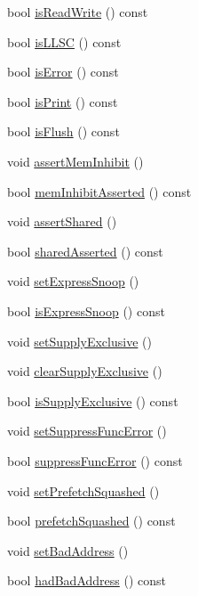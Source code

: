 \begin{DoxyCompactItemize}
bool \hyperlink{classPacket_aa05746eae63aee1fb4758c13d0301a9f}{isReadWrite} () const 
\item 
bool \hyperlink{classPacket_a8965874e960faf91ad4b6af8dbf31875}{isLLSC} () const 
\item 
bool \hyperlink{classPacket_a32759931a1b2d6380407c6a18abd46e3}{isError} () const 
\item 
bool \hyperlink{classPacket_ae56bb417ddf53e85cb389267590fe969}{isPrint} () const 
\item 
bool \hyperlink{classPacket_a5e6baaa42eabbb07af2d1769e3c0499b}{isFlush} () const 
\item 
void \hyperlink{classPacket_a159497b4ab2144a0c1c36d2266df17d1}{assertMemInhibit} ()
\item 
bool \hyperlink{classPacket_a9693a1ffeda326646443ab2a2a92be41}{memInhibitAsserted} () const 
\item 
void \hyperlink{classPacket_a40d9a7952a041e62ac388a0f523dee41}{assertShared} ()
\item 
bool \hyperlink{classPacket_a298938bfa2613955b13f630ce2b591e4}{sharedAsserted} () const 
\item 
void \hyperlink{classPacket_a556d03576cc3d726f41c7e1ad6fbb64a}{setExpressSnoop} ()
\item 
bool \hyperlink{classPacket_aa20026c596161a1efabde68c4a34e00b}{isExpressSnoop} () const 
\item 
void \hyperlink{classPacket_ad0e298222c7b6801ea282a177fac7c39}{setSupplyExclusive} ()
\item 
void \hyperlink{classPacket_a36834b936b153f19a035352b14cf180e}{clearSupplyExclusive} ()
\item 
bool \hyperlink{classPacket_ae74f555f87001a9695338ce38a6ce8ee}{isSupplyExclusive} () const 
\item 
void \hyperlink{classPacket_ad0ca097f61c7d5d16df21635617d8d07}{setSuppressFuncError} ()
\item 
bool \hyperlink{classPacket_a181cb46d55a9f0f933fe649c6937d037}{suppressFuncError} () const 
\item 
void \hyperlink{classPacket_a49108ef8d9510ea6b9982e9e97ca971b}{setPrefetchSquashed} ()
\item 
bool \hyperlink{classPacket_a142c7ae41f822269b145818af682f031}{prefetchSquashed} () const 
\item 
void \hyperlink{classPacket_a44c3e4fcce6474af8052d68e75826c13}{setBadAddress} ()
\item 
bool \hyperlink{classPacket_a729b79fed5294aff99bb49b6b6d888bc}{hadBadAddress} () const 

\end{DoxyCompactItemize}

